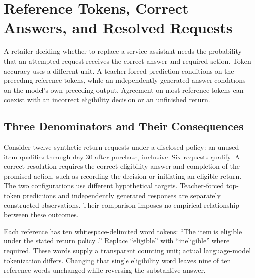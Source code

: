 \hypertarget{M07-reference-tokens-correct-answers-and-resolved-requests}{%
\section{Reference Tokens, Correct Answers, and Resolved
Requests}\label{M07-reference-tokens-correct-answers-and-resolved-requests}}

\noindent \noindent A retailer deciding whether to replace a service assistant
needs the probability that an attempted request receives the correct
answer and required action. Token accuracy uses a different unit. A
teacher-forced prediction conditions on the preceding reference tokens,
while an independently generated answer conditions on the model's own
preceding output. Agreement on most reference tokens can coexist with an
incorrect eligibility decision or an unfinished return.

\hypertarget{M07-three-denominators-and-their-consequences}{%
\subsection{Three Denominators and Their
Consequences}\label{M07-three-denominators-and-their-consequences}}

\noindent \noindent Consider twelve synthetic return requests under a disclosed
policy: an unused item qualifies through day 30 after purchase,
inclusive. Six requests qualify. A correct resolution requires the
correct eligibility answer and completion of the promised action, such
as recording the decision or initiating an eligible return. The two
configurations use different hypothetical targets. Teacher-forced
top-token predictions and independently generated responses are
separately constructed observations. Their comparison imposes no
empirical relationship between these outcomes.

Each reference has ten whitespace-delimited word tokens: ``The item is
eligible under the stated return policy .'' Replace ``eligible'' with
``ineligible'' where required. These words supply a transparent counting
unit; actual language-model tokenization differs. Changing that single
eligibility word leaves nine of ten reference words unchanged while
reversing the substantive answer.


